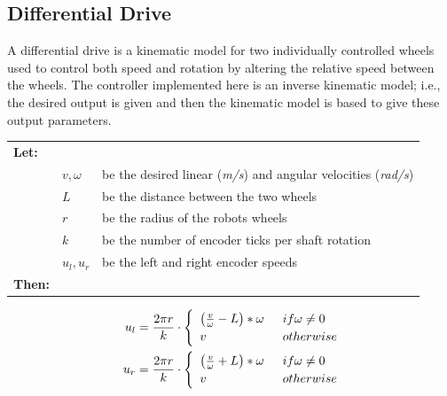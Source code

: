 \documentclass[11pt]{article}
\begin{document}
\subsection{Differential Drive}
A differential drive is a kinematic model for two individually controlled wheels
used to control both speed and rotation by altering the relative speed between
the wheels. The controller implemented here is an inverse kinematic model; i.e.,
the desired output is given and then the kinematic model is based to give these
output parameters. \par
{\footnotesize
  \begin{tabular}{l l l}
    \textbf{Let:} \\
 &$v, \omega$ & be the desired linear (\emph{m/s}) and angular velocities (\emph{rad/s})\\
 &$L$ &be the distance between the two wheels \\
 &$r$ &be the radius of the robots wheels \\
 &$k$ &be the number of encoder ticks per shaft rotation\\
    &$u_l, u_r$ &be the left and right encoder speeds \\
    \textbf{Then:}
  \end{tabular}
  \begin{align}
    u_l &=  \frac{2\pi r}{k} \cdot \begin{cases}
                    \hspace{5pt}\left(\frac{v}{\omega} - L \right) * \omega \hspace{5pt} & if \omega \neq 0\\
                    \hspace{5pt} v & otherwise
                  \end{cases} \vspace{5pt} \\
    u_r &=  \frac{2\pi r}{k} \cdot \begin{cases}
                    \hspace{5pt}\left(\frac{v}{\omega} + L \right) * \omega \hspace{5pt} & if \omega \neq 0\\
                    \hspace{5pt}v & otherwise
                  \end{cases} 
  \end{align}}
\end{document}

